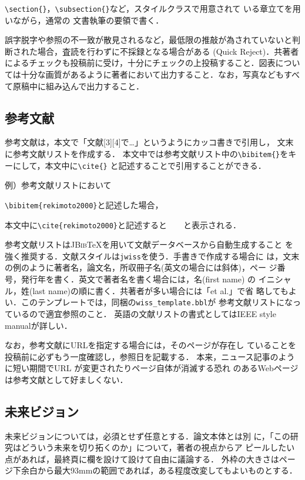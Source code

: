 \documentclass[twoside]{wiss}
\begin{document}
\verb|\section{}|，\verb|\subsection{}|など，スタイルクラスで用意されて
いる章立てを用いながら，通常の \LaTeXe 文書執筆の要領で書く．

誤字脱字や参照の不一致が散見されるなど，最低限の推敲が為されていないと判断された場合，査読を行わずに不採録となる場合がある (Quick Reject)．共著者によるチェックも投稿前に受け，十分にチェックの上投稿すること．図表については十分な画質があるように著者において出力すること．なお，写真などもすべて原稿中に組み込んで出力すること．

\subsection{参考文献}
参考文献は，本文で「文献[3][4]で…」というようにカッコ書きで引用し，
文末に参考文献リストを作成する．
本文中では参考文献リスト中の\verb|\bibitem{}|をキーにして，本文中に\verb|\cite{}|
と記述することで引用することができる．

例）参考文献リストにおいて

\verb|\bibitem{rekimoto2000}|と記述した場合，

本文中に\verb|\cite{rekimoto2000}|と記述すると　\cite{rekimoto2000}　と表示される．

参考文献リストは\textsc{JBib}\TeX を用いて文献データベースから自動生成すること
を強く推奨する．文献スタイルは\verb|jwiss|を使う．手書きで作成する場合に
は，文末の例のように著者名，論文名，所収冊子名(英文の場合には斜体)，ペー
ジ番号，発行年を書く．英文で著者名を書く場合には，名(first name) の
イニシャル，姓(last name)の順に書く．共著者が多い場合には「et al.」で省
略してもよい．このテンプレートでは，同梱の\verb|wiss_template.bbl|が
参考文献リストになっているので適宜参照のこと．
英語の文献リストの書式としてはIEEE style manualが詳しい．

なお，参考文献にURLを指定する場合には，そのページが存在し
ていることを投稿前に必ずもう一度確認し，参照日を記載する．
本来，ニュース記事のように短い期間でURL が変更されたりページ自体が消滅する恐れ
のあるWebページは参考文献として好ましくない．

\subsection{未来ビジョン}
未来ビジョンについては，必須とせず任意とする．論文本体とは別
に，「この研究はどういう未来を切り拓くのか」について，著者の視点からア
ピールしたい点があれば，最終頁に欄を設けて設けて自由に議論する．
外枠の大きさはページ下余白から最大93mmの範囲であれば，ある程度改変してもよいものとする．
\end{document}

